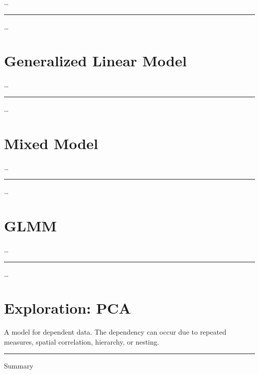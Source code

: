 \documentclass[
]{book}
\begin{document}
\ldots{}

\begin{center}\rule{0.5\linewidth}{0.5pt}\end{center}

\ldots{}

\hypertarget{generalized-linear-model}{%
\chapter{Generalized Linear Model}\label{generalized-linear-model}}

\ldots{}

\begin{center}\rule{0.5\linewidth}{0.5pt}\end{center}

\ldots{}

\hypertarget{mixed-model}{%
\chapter{Mixed Model}\label{mixed-model}}

\ldots{}

\begin{center}\rule{0.5\linewidth}{0.5pt}\end{center}

\ldots{}

\hypertarget{glmm}{%
\chapter{GLMM}\label{glmm}}

\ldots{}

\begin{center}\rule{0.5\linewidth}{0.5pt}\end{center}

\ldots{}

\hypertarget{exploration-pca}{%
\chapter{Exploration: PCA}\label{exploration-pca}}

A model for dependent data. The dependency can occur due to repeated measures, spatial correlation, hierarchy, or nesting.

\begin{center}\rule{0.5\linewidth}{0.5pt}\end{center}

Summary
\end{document}

